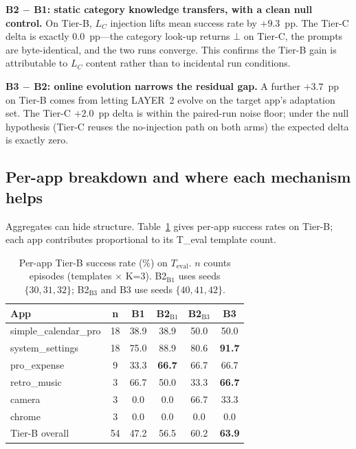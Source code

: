 \textbf{B2 $-$ B1: static category knowledge transfers, with a clean null control.} On Tier-B, $L_C$ injection lifts mean success rate by $+9.3$~pp. The Tier-C delta is exactly $0.0$~pp---the category look-up returns $\bot$ on Tier-C, the prompts are byte-identical, and the two runs converge. This confirms the Tier-B gain is attributable to $L_C$ content rather than to incidental run conditions.

\textbf{B3 $-$ B2: online evolution narrows the residual gap.} A further $+3.7$~pp on Tier-B comes from letting LAYER~2 evolve on the target app's adaptation set. The Tier-C $+2.0$~pp delta is within the paired-run noise floor; under the null hypothesis (Tier-C reuses the no-injection path on both arms) the expected delta is exactly zero.

\subsection{Per-app breakdown and where each mechanism helps}
\label{sec:eval-analysis}

Aggregates can hide structure. Table~\ref{tab:perapp} gives per-app success rates on Tier-B; each app contributes proportional to its T\_eval template count.

\begin{table}[t]
\small
\centering
\begin{tabular}{l@{\,}c@{\,}c@{\,}c@{\,}c@{\,}c}
\hline
\textbf{App}             & \textbf{n} & \textbf{B1} & \textbf{B2$_{\text{B1}}$} & \textbf{B2$_{\text{B3}}$} & \textbf{B3} \\
\hline
simple\_calendar\_pro    & 18 & 38.9 & 38.9 & 50.0 & 50.0 \\
system\_settings         & 18 & 75.0 & 88.9 & 80.6 & \textbf{91.7} \\
pro\_expense             &  9 & 33.3 & \textbf{66.7} & 66.7 & 66.7 \\
retro\_music             &  3 & 66.7 & 50.0 & 33.3 & \textbf{66.7} \\
camera                   &  3 &  0.0 &  0.0 & 66.7 & 33.3 \\
chrome                   &  3 &  0.0 &  0.0 &  0.0 &  0.0 \\
\hline
Tier-B overall           & 54 & 47.2 & 56.5 & 60.2 & \textbf{63.9} \\
\hline
\end{tabular}
\caption{Per-app Tier-B success rate (\%) on $T_{\text{eval}}$. $n$ counts episodes (templates $\times$ K=3). B2$_{\text{B1}}$ uses seeds $\{30, 31, 32\}$; B2$_{\text{B3}}$ and B3 use seeds $\{40, 41, 42\}$.}
\label{tab:perapp}
\end{table}

